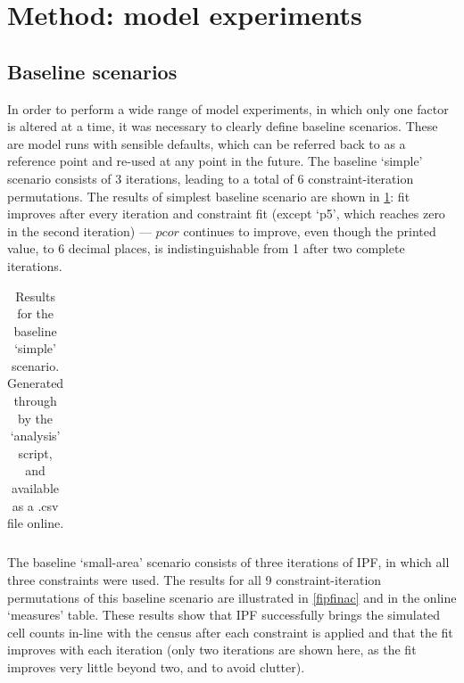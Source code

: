\documentclass[a4paper,10pt]{article}
\begin{document}


\section{Method: model experiments}
\subsection{Baseline scenarios}
In order to perform a wide range of model experiments, 
in which only one factor is altered at a time, it was necessary 
to clearly define baseline scenarios. These are model runs with sensible 
defaults, which can be referred back to as a reference point and re-used at 
any point in the future. The baseline ‘simple’ scenario consists of 3 iterations, 
leading to a total of 6 constraint-iteration permutations. The results of simplest 
baseline scenario are shown in \cref{tblresults1}: 
fit improves after every iteration and constraint  
fit (except `p5', which reaches zero in the second iteration) --- $pcor$ continues to improve, 
even though the printed value, to 6 decimal places, is indistinguishable from 1 after two complete iterations.

\begin{table}[htbp]
\caption{Results for the baseline `simple' scenario. Generated through by the ‘analysis’ script, and available as a .csv file online.}
\begin{center}
\begin{tabular}{rrrrr}
\toprule
\bottomrule
\end{tabular}
\end{center}
\label{tblresults1}
\end{table}

The baseline `small-area' scenario consists of three
 iterations of IPF, in which all three constraints were 
used. The results for all 9 constraint-iteration permutations 
of this baseline scenario are illustrated in \cref{fipfinac} and %
in the online `measures' table. These results show that IPF successfully 
brings the simulated cell counts in-line with the census after each constraint 
is applied and that the fit improves with each iteration (only two iterations are 
shown here, as the fit improves very little beyond two, and to avoid clutter).
\end{document}
